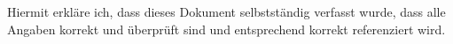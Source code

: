 
Hiermit erkläre ich, dass dieses Dokument selbstständig verfasst wurde, dass alle Angaben korrekt
und überprüft sind und entsprechend korrekt referenziert wird.\newline\newline
\gitAuthorDate~\gitAuthorName
